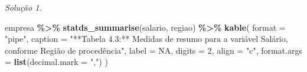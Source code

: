 \documentclass[
]{latex/krantz}
\newenvironment{Shaded}{\begin{snugshade}}{\end{snugshade}}
\newcommand{\AttributeTok}[1]{\textcolor[rgb]{0.13,0.29,0.53}{#1}}
\newcommand{\ConstantTok}[1]{\textcolor[rgb]{0.56,0.35,0.01}{#1}}
\newcommand{\DecValTok}[1]{\textcolor[rgb]{0.00,0.00,0.81}{#1}}
\newcommand{\FunctionTok}[1]{\textcolor[rgb]{0.13,0.29,0.53}{\textbf{#1}}}
\newcommand{\NormalTok}[1]{#1}
\newcommand{\SpecialCharTok}[1]{\textcolor[rgb]{0.81,0.36,0.00}{\textbf{#1}}}
\newcommand{\StringTok}[1]{\textcolor[rgb]{0.31,0.60,0.02}{#1}}
\theoremstyle{definition}
\theoremstyle{definition}
\theoremstyle{definition}
\theoremstyle{definition}
\theoremstyle{remark}
\newtheorem*{solution}{Solução}
\begin{document}
\begin{solution}
\begin{Shaded}
\begin{Highlighting}[]
\NormalTok{empresa }\SpecialCharTok{\%\textgreater{}\%}
  \FunctionTok{statds\_summarise}\NormalTok{(salario, regiao) }\SpecialCharTok{\%\textgreater{}\%}
  \FunctionTok{kable}\NormalTok{(}
    \AttributeTok{format =} \StringTok{"pipe"}\NormalTok{,}
    \AttributeTok{caption =} \StringTok{"**Tabela 4.3:** Medidas de resumo para a variável \textasciigrave{}Salário\textasciigrave{}, conforme \textasciigrave{}Região de procedência\textasciigrave{}"}\NormalTok{,}
    \AttributeTok{label =} \ConstantTok{NA}\NormalTok{,}
    \AttributeTok{digits =} \DecValTok{2}\NormalTok{,}
    \AttributeTok{align =} \StringTok{"c"}\NormalTok{,}
    \AttributeTok{format.args =} \FunctionTok{list}\NormalTok{(}\AttributeTok{decimal.mark =} \StringTok{","}\NormalTok{)}
\NormalTok{  )}
\end{Highlighting}
\end{Shaded}


\end{solution}
\end{document}

